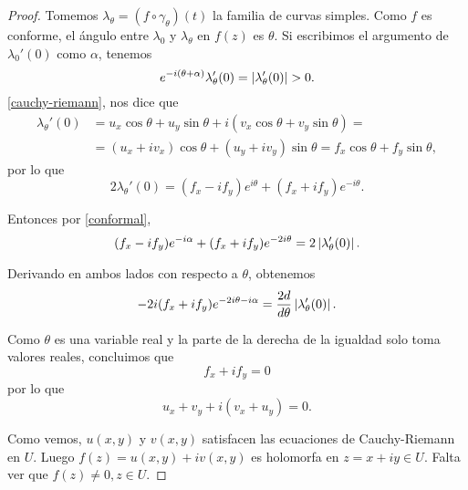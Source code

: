 \begin{proof}
    Tomemos $\lambda_\theta = (f \circ  \gamma_\theta)(t)$ la familia de curvas simples. Como $f$ es conforme, el ángulo entre $\lambda_0$ y $\lambda_{\theta}$ en $f(z)$ es $\theta$. Si escribimos el argumento de $\lambda_0'(0)$ como $\alpha$, tenemos
    \begin{equation*}
    \label{conformal}
        e^{-i(\theta + \alpha)} \lambda_{\theta}'(0)= \left\lvert\lambda_{\theta}'(0)\right\rvert > 0.
    \end{equation*}
    \ref{cauchy-riemann}, nos dice que
    \begin{equation*}
    \begin{split}
        \lambda_{\theta}'(0) & = u_x \cos \theta + u_y \sin \theta + i(v_x \cos \theta + v_y \sin \theta) = \\
                             & = (u_x + iv_x) \cos \theta + (u_y + i v_y) \sin \theta = f_x \cos \theta + f_y \sin \theta,
    \end{split}
    \end{equation*}
    por lo que
    \begin{equation*}
        2 \lambda_{\theta}'(0) = (f_x - i f_y) e^{i \theta} + (f_x + i f_y) e^{-i \theta}.
    \end{equation*}

    Entonces por \ref{conformal},
    \begin{equation*}
         (f_x - i f_y) e^{-i \alpha} + (f_x + i f_y) e^{-2i \theta} = 2 \left\lvert\lambda_{\theta}'(0)\right\rvert.
    \end{equation*}

    Derivando en ambos lados con respecto a $\theta$, obtenemos
    \begin{equation*}
        -2i (f_x + i f_y) e^{-2i \theta - i \alpha} = \frac{2d}{d \theta} \left\lvert\lambda_{\theta}'(0)\right\rvert.
    \end{equation*}

    Como $\theta$ es una variable real y la parte de la derecha de la igualdad solo toma valores reales, concluimos que
    \begin{equation*}
        f_x + i f_y = 0
    \end{equation*}
    por lo que
    \begin{equation*}
        u_x + v_y + i(v_x + u_y) = 0.
    \end{equation*}

    Como vemos, $u(x,y)$ y $v(x,y)$ satisfacen las ecuaciones de Cauchy-Riemann en $U$. Luego $f(z) = u(x,y) + i v(x,y)$ es holomorfa en $z = x + iy \in U$. Falta ver que $f(z) \not = 0, z \in U$.
\end{proof}

